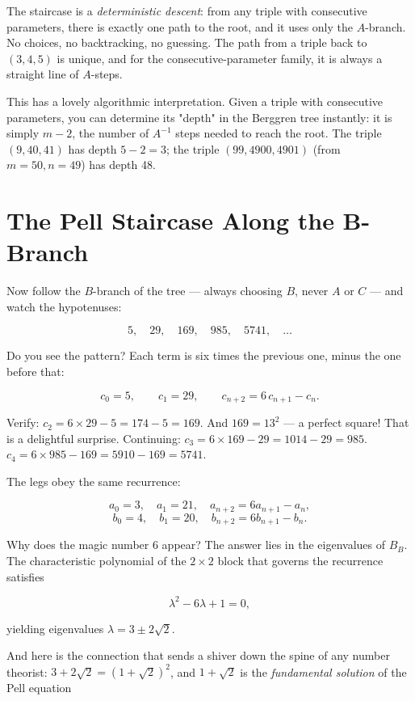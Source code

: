 \documentclass[11pt,openright,twoside]{book}
\theoremstyle{definition}
\begin{document}
The staircase is a \textit{deterministic descent}: from any triple with consecutive parameters, there is exactly one path to the root, and it uses only the $A$-branch. No choices, no backtracking, no guessing. The path from a triple back to $(3, 4, 5)$ is unique, and for the consecutive-parameter family, it is always a straight line of $A$-steps.

This has a lovely algorithmic interpretation. Given a triple with consecutive parameters, you can determine its "depth" in the Berggren tree instantly: it is simply $m - 2$, the number of $A^{-1}$ steps needed to reach the root. The triple $(9, 40, 41)$ has depth $5 - 2 = 3$; the triple $(99, 4900, 4901)$ (from $m = 50, n = 49$) has depth 48.


\bigskip


\section{The Pell Staircase Along the B-Branch}

Now follow the $B$-branch of the tree --- always choosing $B$, never $A$ or $C$ --- and watch the hypotenuses:

\[5, \quad 29, \quad 169, \quad 985, \quad 5741, \quad \ldots\]

Do you see the pattern? Each term is six times the previous one, minus the one before that:

\[c_0 = 5, \qquad c_1 = 29, \qquad c_{n+2} = 6\,c_{n+1} - c_n.\]

Verify: $c_2 = 6 \times 29 - 5 = 174 - 5 = 169$. And $169 = 13^2$ --- a perfect square! That is a delightful surprise. Continuing: $c_3 = 6 \times 169 - 29 = 1014 - 29 = 985$. $c_4 = 6 \times 985 - 169 = 5910 - 169 = 5741$.

The legs obey the same recurrence:

\[a_0 = 3,\quad a_1 = 21,\quad a_{n+2} = 6a_{n+1} - a_n,\]
\[b_0 = 4,\quad b_1 = 20,\quad b_{n+2} = 6b_{n+1} - b_n.\]

Why does the magic number $6$ appear? The answer lies in the eigenvalues of $B_B$. The characteristic polynomial of the $2 \times 2$ block that governs the recurrence satisfies

\[\lambda^2 - 6\lambda + 1 = 0,\]

yielding eigenvalues $\lambda = 3 \pm 2\sqrt{2}$.

And here is the connection that sends a shiver down the spine of any number theorist: $3 + 2\sqrt{2} = (1 + \sqrt{2})^2$, and $1 + \sqrt{2}$ is the \textit{fundamental solution} of the Pell equation
\end{document}
